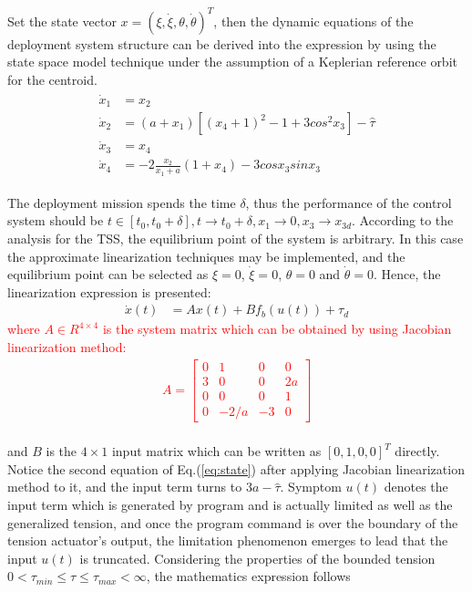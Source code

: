\documentclass[3p]{elsarticle}
\theoremstyle{plain}
\begin{document}
Set the state vector ${x} = (\xi,\dot\xi,\theta,\dot\theta)^T$, then the dynamic equations of the deployment system structure can be derived into the expression by using the state space model technique under the assumption of a Keplerian reference orbit for the centroid.
\begin{align}
\begin{split}
\dot{x}_1&=x_2\\
\dot{x}_2&=(a+x_1)[(x_4+1)^2-1+3cos{^2x_3}]-\hat{\tau}\\
\dot{x}_3&=x_4\\
\dot{x}_4&=-2\frac{x_2}{x_1+a}(1+x_4)-3cos{x_3}sin{x_3}\label{eq:state}
\end{split}
\end{align}\par
The deployment mission spends the time $\delta$, thus the performance of the control system should be $t\in [t_0,t_0+\delta],t\to t_0+\delta,x_1\to 0,x_3\to x_{3d}$. According to the analysis for the TSS, the equilibrium point of the system is arbitrary. In this case the approximate linearization techniques may be implemented, and the equilibrium point can be selected as $\xi = 0$, $\dot\xi = 0$, $\theta = 0$ and $\dot\theta = 0$. Hence, the linearization expression is presented:
\begin{align}
\dot x(t) &= Ax(t) + Bf_{b}(u(t)) + \tau_d\label{eq:ABC}
\end{align}
\textcolor{red}{where $A\in R^{4\times4}$ is the system matrix which can be obtained by using Jacobian linearization method:
\begin{align}
A=\begin{bmatrix}
0 &1 &0 &0\\
3 &0 &0 &2a\\
0 &0 &0 &1\\
0 &-2/a &-3 &0
\end{bmatrix}
\end{align}}\\
and $B$ is the $4\times1$ input matrix which can be written as $[0,1,0,0]^T$  directly. Notice the second equation of Eq.(\ref{eq:state}) after applying Jacobian linearization method to it, and the input term turns to $3a-\hat{\tau}$. Symptom $u(t)$ denotes the input term which is generated by program and is actually limited as well as the generalized tension, and once the program command is over the boundary of the tension actuator's output, the limitation phenomenon emerges to lead that the input $u(t)$ is truncated. Considering the properties of the bounded tension $0<\tau_{min}\le \tau\le \tau_{max} < \infty$, the mathematics expression follows
\end{document}
